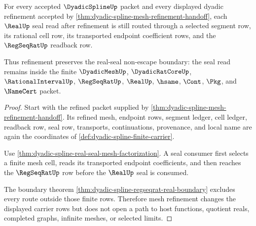 \begin{theorem}
\label{thm:dyadic-spline-real-seal-stability}
For every accepted $\DyadicSplineUp$ packet and every displayed dyadic refinement accepted by \autoref{thm:dyadic-spline-mesh-refinement-handoff}, each $\RealUp$ seal read after refinement is still routed through a selected segment row, its rational cell row, its transported endpoint coefficient rows, and the $\RegSeqRatUp$ readback row.

Thus refinement preserves the real-seal non-escape boundary: the seal read remains inside the finite $\DyadicMeshUp$, $\DyadicRatCoreUp$, $\RationalIntervalUp$, $\RegSeqRatUp$, $\RealUp$, $\hsame$, $\Cont$, $\Pkg$, and $\NameCert$ packet.
\end{theorem}
\begin{proof}
Start with the refined packet supplied by \autoref{thm:dyadic-spline-mesh-refinement-handoff}. Its refined mesh, endpoint rows, segment ledger, cell ledger, readback row, seal row, transports, continuations, provenance, and local name are again the coordinates of \autoref{def:dyadic-spline-finite-carrier}.

Use \autoref{thm:dyadic-spline-real-seal-mesh-factorization}. A seal consumer first selects a finite mesh cell, reads its transported endpoint coefficients, and then reaches the $\RegSeqRatUp$ row before the $\RealUp$ seal is consumed.

The boundary theorem \autoref{thm:dyadic-spline-regseqrat-real-boundary} excludes every route outside those finite rows. Therefore mesh refinement changes the displayed carrier rows but does not open a path to host functions, quotient reals, completed graphs, infinite meshes, or selected limits.
\end{proof}

